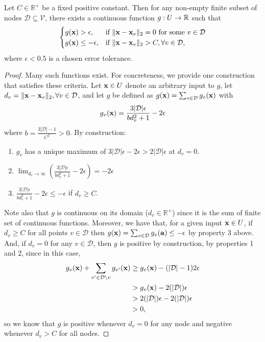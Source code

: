 \begin{lemma}
Let $C \in \mathbb{R}^+$ be a fixed positive constant. 
Then for any non-empty finite subset of nodes $\mathcal{D} \subseteq \mathcal{V}$, there exists a continuous function $g : U \rightarrow \mathbb{R}$ such that 
\begin{equation}
\begin{cases}
g(\mathbf{x}) > \epsilon,& \textrm{if $\|\mathbf{x}-\mathbf{x}_v\|_2 = 0$ for some $v \in \mathcal{D}$}\\
g(\mathbf{x}) \leq {-}\epsilon,&\textrm{if $\|\mathbf{x}-\mathbf{x}_v\|_2 > C, \forall v \in \mathcal{D}$},
\end{cases}
\end{equation}
where $\epsilon < 0.5$ is a chosen error tolerance. 
\end{lemma}
\begin{proof}
Many such functions exist. For concreteness, we provide one construction that satisfies these criteria. 
Let $\mathbf{x} \in U$ denote an arbitrary input to $g$, let $d_v = \|\mathbf{x} - \mathbf{x}_v\|_2, \forall v \in \mathcal{D}$, and let $g$ be defined as $g(\mathbf{x}) = \sum_{v \in \mathcal{D}} g_v(\mathbf{x})$ with
\newcommand{\setsize}{|\mathcal{D}|}
\begin{equation}
g_v(\mb{x}) =  \frac{3\setsize\epsilon}{bd_v^2 + 1} - 2\epsilon
\end{equation}
where $b = \frac{3\setsize - 1}{C^2}>0$.
By construction:
\begin{enumerate}
\item
	$g_v$ has a unique maximum of $3\setsize\epsilon-2\epsilon>2\setsize\epsilon$ at $d_v = 0$. 
\item
	$\lim_{d_v \rightarrow \infty}\left(  \frac{3\setsize\epsilon}{bd_v^2 + 1} - 2\epsilon \right) = -2\epsilon$
\item 
   $\frac{3\setsize\epsilon}{bd_v^2 + 1} - 2\epsilon \leq -\epsilon$ if $d_v \geq C$. 
\end{enumerate}
Note also that $g$ is continuous on its domain ($d_v \in \mathbb{R}^+$) since it is the sum of finite set of continuous functions. 
Moreover, we have that, for a given input $\mathbf{x} \in U$, if $d_v\geq C$ for all points $v \in \mathcal{D}$ then $g(\mathbf{x}) = \sum_{v \in \mathcal{D}} g_v(\mathbf{a}) \leq {-}\epsilon$ by property 3 above. 
And, if $d_v=0$ for any $v \in \mathcal{D}$, then $g$ is positive by construction, by properties 1 and 2, since in this case,
\begin{align*}
g_v(\mb{x}) + \sum_{v' \in \mathcal{D}\setminus v}g_{v'}(\mb{x}) &\geq g_v(\mb{x}) - (\setsize -1)2\epsilon\\
&> g_v(\mb{x}) - 2(\setsize)\epsilon\\
&>2(\setsize)\epsilon - 2(\setsize)\epsilon\\
& >0,
\end{align*}
 so we know that $g$ is positive whenever $d_v = 0$ for any node and negative whenever $d_v > C$ for all nodes.  
\end{proof}

